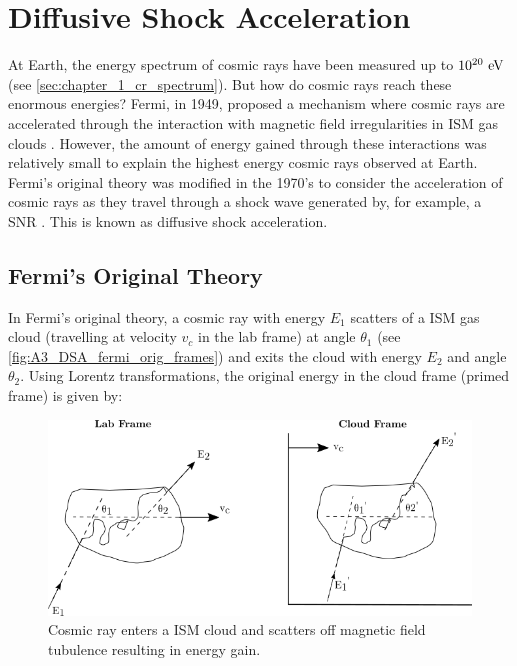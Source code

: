 \chapter{Diffusive Shock Acceleration} \label{A3_DSA}

At Earth, the energy spectrum of cosmic rays have been measured up to $10^{20}~\si{\electronvolt}$ (see \autoref{sec:chapter_1_cr_spectrum}). But how do cosmic rays reach these enormous energies? Fermi, in 1949, proposed a mechanism where cosmic rays are accelerated through the interaction with magnetic field irregularities in ISM gas clouds \citep{1949PhRv...75.1169F}. However, the amount of energy gained through these interactions was relatively small to explain the highest energy cosmic rays observed at Earth. Fermi's original theory was modified in the 1970's to consider the acceleration of cosmic rays as they travel through a shock wave generated by, for example, a SNR \citep{1977DoSSR.234.1306K,1977ICRC...11..132A,1978MNRAS.182..147B,1978MNRAS.182..443B,1978ApJ...221L..29B}. This is known as diffusive shock acceleration.

\section{Fermi's Original Theory}

In Fermi's original theory, a cosmic ray with energy $E_1$  scatters of a ISM gas cloud (travelling at velocity $v_c$ in the lab frame) at angle $\theta_1$ (see \autoref{fig:A3_DSA_fermi_orig_frames}) and exits the cloud with energy $E_2$ and angle $\theta_2$. Using Lorentz transformations, the original energy in the cloud frame (primed frame) is given by:

\begin{figure}
    \centering
    \includegraphics{A3_Diffusive_Shock_Acceleration/Images/fermi_original_theory_frames.png}
    \caption*{Cosmic ray enters a ISM cloud and scatters off magnetic field tubulence resulting in energy gain.}
    \label{fig:A3_DSA_fermi_orig_frames}
\end{figure}

